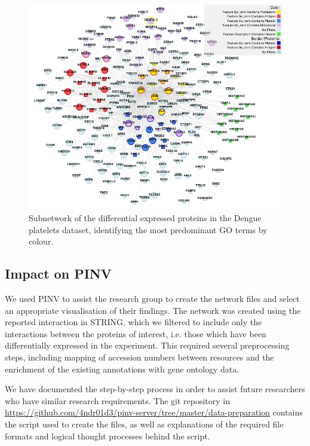 \begin{figure}
\centering
\includegraphics[width=\textwidth]{figures/pinv_platelets_2.png}
\caption[Subnetwork of the differentially expressed proteins identifying the most predominant GO terms.]{Subnetwork of the differential expressed proteins in the Dengue platelets dataset, identifying the most predominant GO terms by colour.
\label{fig:pinv_platelets_2}}
\end{figure}

\subsection{Impact on PINV}
We used PINV to assist the research group to create the network files and select an appropriate visualisation of their findings. The network was created using the reported interaction in STRING, which we filtered to include only the interactions between the proteins of interest, i.e. those which have been differentially expressed in the experiment. This required several preprocessing steps, including mapping of accession numbers between resources and the enrichment of the existing annotations with gene ontology data.

We have documented the step-by-step process in order to assist future researchers who have similar research requirements. The git repository in \url{https://github.com/4ndr01d3/pinv-server/tree/master/data-preparation} contains the script used to create the files, as well as explanations of the required file formats and logical thought processes behind the script.

